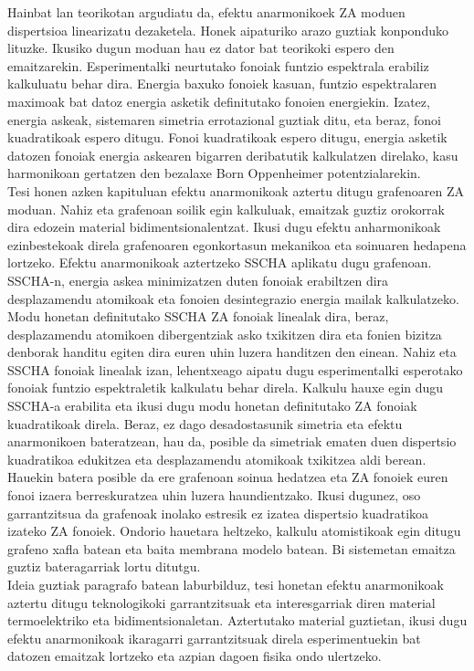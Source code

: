 Hainbat lan teorikotan\cite{wang2016anharmonic,los2009scaling,katsnelson2013graphene,zakharchenko2009finite,mariani2008flexural,amorim2014thermodynamics,de2012bending} argudiatu da, efektu anarmonikoek ZA moduen dispertsioa linearizatu 
dezaketela. Honek aipaturiko arazo guztiak konponduko lituzke. Ikusiko dugun moduan hau ez dator bat teorikoki espero 
den emaitzarekin. Esperimentalki neurtutako fonoiak funtzio espektrala erabiliz kalkuluatu behar dira. Energia baxuko 
fonoiek kasuan, funtzio espektralaren maximoak bat datoz energia asketik definitutako fonoien energiekin. Izatez, 
energia askeak, sistemaren simetria errotazional guztiak ditu, eta beraz, fonoi kuadratikoak espero ditugu. Fonoi 
kuadratikoak espero ditugu, energia asketik datozen fonoiak energia askearen bigarren deribatutik kalkulatzen 
direlako, kasu harmonikoan gertatzen den bezalaxe Born Oppenheimer potentzialarekin. \\

Tesi honen azken kapituluan efektu anarmonikoak aztertu ditugu grafenoaren ZA moduan. Nahiz eta grafenoan soilik 
egin kalkuluak, emaitzak guztiz orokorrak dira edozein material bidimentsionalentzat. Ikusi dugu efektu anharmonikoak 
ezinbestekoak direla grafenoaren egonkortasun mekanikoa eta soinuaren hedapena lortzeko. Efektu anarmonikoak 
aztertzeko SSCHA aplikatu dugu grafenoan. SSCHA-n, energia askea minimizatzen duten fonoiak erabiltzen dira 
desplazamendu atomikoak eta fonoien desintegrazio energia mailak kalkulatzeko. Modu honetan definitutako 
SSCHA ZA fonoiak linealak dira, beraz, desplazamendu atomikoen dibergentziak asko txikitzen dira eta fonien bizitza 
denborak handitu egiten dira euren uhin luzera handitzen den einean. Nahiz eta SSCHA fonoiak linealak izan, 
lehentxeago aipatu dugu esperimentalki esperotako fonoiak funtzio espektraletik kalkulatu behar direla. Kalkulu 
hauxe egin dugu SSCHA-a erabilita eta ikusi dugu modu honetan definitutako ZA fonoiak kuadratikoak direla. Beraz, 
ez dago desadostasunik simetria eta efektu anarmonikoen bateratzean, hau da, posible da simetriak ematen duen 
dispertsio kuadratikoa edukitzea eta desplazamendu atomikoak txikitzea aldi berean. Hauekin batera posible da ere 
grafenoan soinua hedatzea eta ZA fonoiek euren fonoi izaera berreskuratzea uhin luzera haundientzako. Ikusi dugunez, 
oso garrantzitsua da grafenoak inolako estresik ez izatea dispertsio kuadratikoa izateko ZA fonoiek. Ondorio hauetara 
heltzeko, kalkulu atomistikoak egin ditugu grafeno xafla batean eta baita membrana modelo batean. Bi sistemetan 
emaitza guztiz bateragarriak lortu ditutgu. \\

Ideia guztiak paragrafo batean laburbilduz, tesi honetan efektu anarmonikoak aztertu ditugu teknologikoki 
garrantzitsuak eta interesgarriak diren material termoelektriko eta bidimentsionaletan. Aztertutako material 
guztietan, ikusi dugu efektu anarmonikoak ikaragarri garrantzitsuak direla esperimentuekin bat datozen emaitzak 
lortzeko eta azpian dagoen fisika ondo ulertzeko.
